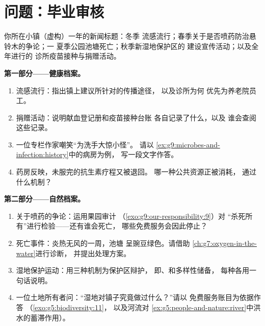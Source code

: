 \section{问题：毕业审核}

\begin{problem}\label{pb:g9:our-responsibility:1}
你所在小镇（虚构）一年的新闻标题：冬季
流感流行；春季关于是否喷药防治悬铃木的争论；一
夏季公园池塘死亡；秋季新湿地保护区的
建设宣传活动；以及全年进行的
诊所疫苗接种与捐赠活动。

\medskip\noindent\textbf{第一部分——健康档案。}
\begin{enumerate}
  \item 流感流行：指出镇上建议所针对的传播途径，
        以及诊所为何
        优先为养老院员工。
  \item 捐赠活动：说明献血登记册和疫苗接种台账
        各自记录了什么，以及
        谁会查阅这些记录。
  \item 一位专栏作家嘲笑“为洗手大惊小怪”。
        请以
        \cref{ex:g9:microbes-and-infection:history}中的病房为例，
        写一段文字作答。
  \item 药房反映，未服完的抗生素疗程又被退回。
        哪一种公共资源正被消耗，
        通过什么机制？
\end{enumerate}

\medskip\noindent\textbf{第二部分——自然档案。}
\begin{enumerate}[resume]
  \item 关于喷药的争论：运用果园审计
        （\cref{exo:g9:our-responsibility:9}）对
        “杀死所有”进行检验——还有谁会死亡，
        哪些免费服务会因此停止？
  \item {}死亡事件：炎热无风的一周，池塘
        呈豌豆绿色。请借助
        \cref{ch:g7:oxygen-in-the-water}进行诊断，
        并提出处理方案。
  \item 湿地保护运动：用三种机制为保护区辩护，
        即、和多样性储备，
        每种各用一句话说明。
  \item 一位土地所有者问：“湿地对镇子究竟做过什么？”请以
        免费服务账目为依据作答
        （\cref{exo:g5:biodiversity:11}，
        以及河流对
        \cref{ex:g5:people-and-nature:river}中洪水的蓄滞作用）。
\end{enumerate}


\end{problem}
